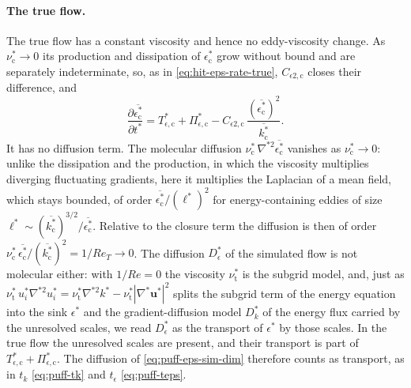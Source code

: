 \documentclass{article}
\begin{document}
\paragraph{The true flow.}
The true flow has a constant viscosity and hence no eddy-viscosity change. As
$\nu_{\mathrm{c}}^* \to 0$ its production and dissipation of
$\epsilon_{\mathrm{c}}^*$ grow without bound and are separately
indeterminate, so, as in \eqref{eq:hit-eps-rate-true},
$C_{\epsilon 2,\mathrm{c}}$ closes their difference, and
\begin{equation}\label{eq:puff-eps-true-dim}
  \frac{\partial \overline{\epsilon_{\mathrm{c}}^*}}{\partial t^*}
  = T_{\epsilon,\mathrm{c}}^* + \Pi_{\epsilon,\mathrm{c}}^*
  - C_{\epsilon 2,\mathrm{c}}\, \frac{\left(\overline{\epsilon_{\mathrm{c}}^*}\right)^2}{\overline{k_{\mathrm{c}}^*}} .
\end{equation}
It has no diffusion term. The molecular diffusion
$\nu_{\mathrm{c}}^*\, \nabla^{*2} \overline{\epsilon_{\mathrm{c}}^*}$
vanishes as $\nu_{\mathrm{c}}^* \to 0$: unlike the dissipation and the
production, in which the viscosity multiplies diverging fluctuating
gradients, here it multiplies the Laplacian of a mean field, which stays
bounded, of order $\overline{\epsilon_{\mathrm{c}}^*}/(\ell^*)^2$ for
energy-containing eddies of size
$\ell^* \sim (\overline{k_{\mathrm{c}}^*})^{3/2}/\overline{\epsilon_{\mathrm{c}}^*}$.
Relative to the closure term the diffusion is then of order
$\nu_{\mathrm{c}}^*\, \overline{\epsilon_{\mathrm{c}}^*}/(\overline{k_{\mathrm{c}}^*})^2 = 1/Re_T \to 0$.
The diffusion $D_\epsilon^*$ of the simulated flow is not molecular either:
with $1/Re = 0$ the viscosity $\nu_{\mathrm{t}}^*$ is the subgrid model, and,
just as $\nu_{\mathrm{t}}^*\, u_i^* \nabla^{*2} u_i^* = \nu_{\mathrm{t}}^* \nabla^{*2} k^*
- \nu_{\mathrm{t}}^* |\nabla^* \mathbf{u}^*|^2$ splits the subgrid term of
the energy equation into the sink $\epsilon^*$ and the gradient-diffusion
model $D_k^*$ of the energy flux carried by the unresolved scales, we read
$D_\epsilon^*$ as the transport of $\epsilon^*$ by those scales. In the true
flow the unresolved scales are present, and their transport is part of
$T_{\epsilon,\mathrm{c}}^* + \Pi_{\epsilon,\mathrm{c}}^*$. The diffusion of
\eqref{eq:puff-eps-sim-dim} therefore counts as transport, as in
$t_k$ \eqref{eq:puff-tk} and $t_\epsilon$ \eqref{eq:puff-teps}.
\end{document}
